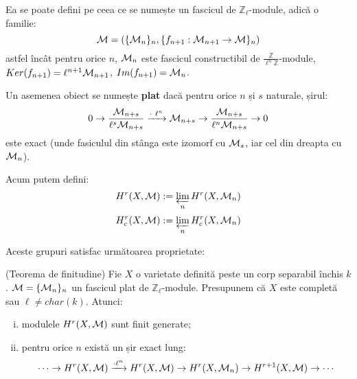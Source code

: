 \documentclass[13pt,openany]{book}
\begin{document}
Ea se poate defini pe ceea ce se numește un fascicul de $\mathbb{Z}_\ell$-module, adică o familie:
$$\mathcal{M}=(\{\mathcal{M}_n\}_n,\{f_{n+1}:\mathcal{M}_{n+1}\rightarrow\mathcal{M}\}_n)$$
astfel încât pentru orice $n$, $\mathcal{M}_n$ este fascicul constructibil de $\frac{\mathbb{Z}}{\ell^n\mathbb{Z}}$-module, $Ker(f_{n+1})=\ell^{n+1}\mathcal{M}_{n+1}$, $Im(f_{n+1})=\mathcal{M}_n$.

Un asemenea obiect se numește {\bf plat} dacă pentru orice $n$ și $s$ naturale, șirul:
$$0 \rightarrow \frac{\mathcal{M}_{n+s}}{\ell^s\mathcal{M}_{n+s}} \xrightarrow{\cdot\ \ell^n} \mathcal{M}_{n+s} \rightarrow \frac{\mathcal{M}_{n+s}}{\ell^n\mathcal{M}_{n+s}} \rightarrow 0$$
este exact (unde fasiculul din stânga este izomorf cu $\mathcal{M}_s$, iar cel din dreapta cu $\mathcal{M}_n$).

Acum putem defini:
$$H^r(X,\mathcal{M}):=\varprojlim_n H^r(X,\mathcal{M}_n)$$
$$H^r_c(X,\mathcal{M}):=\varprojlim_n H^r_c(X,\mathcal{M}_n)$$

Aceste grupuri satisfac următoarea proprietate:

\begin{teo}
(Teorema de finitudine) Fie $X$ o varietate definită peste un corp separabil închis $k$. $\mathcal{M}=\{\mathcal{M}_n\}_n$ un fascicul plat de $\mathbb{Z}_\ell$-module. Presupunem că $X$ este completă sau $\ell \neq char(k)$. Atunci:
\begin{enumerate}[(i)]
\item modulele $H^r(X,\mathcal{M})$ sunt finit generate;
\item pentru orice $n$ există un șir exact lung:
$$\cdots \rightarrow H^r(X,\mathcal{M}) \xrightarrow{\cdot \ell^n} H^r(X,\mathcal{M}) \rightarrow H^r(X,\mathcal{M}_n) \rightarrow H^{r+1}(X,\mathcal{M}) \rightarrow \cdots$$
\end{enumerate}
\end{teo}
\end{document}
